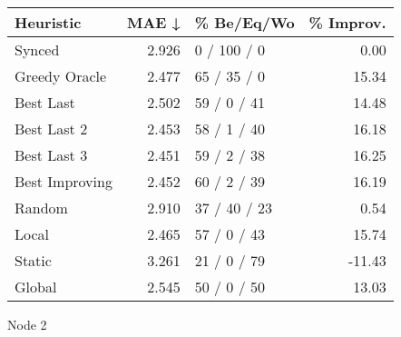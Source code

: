 \begin{tabular}{lrlr}
\toprule
\textbf{Heuristic} & \textbf{MAE ↓} & \textbf{\% Be/Eq/Wo} & \textbf{\% Improv.} \\
\midrule
            Synced &          2.926 &          0 / 100 / 0 &                0.00 \\
     Greedy Oracle &          2.477 &          65 / 35 / 0 &               15.34 \\
         Best Last &          2.502 &          59 / 0 / 41 &               14.48 \\
       Best Last 2 &          2.453 &          58 / 1 / 40 &               16.18 \\
       Best Last 3 &          2.451 &          59 / 2 / 38 &               16.25 \\
    Best Improving &          2.452 &          60 / 2 / 39 &               16.19 \\
            Random &          2.910 &         37 / 40 / 23 &                0.54 \\
             Local &          2.465 &          57 / 0 / 43 &               15.74 \\
            Static &          3.261 &          21 / 0 / 79 &              -11.43 \\
            Global &          2.545 &          50 / 0 / 50 &               13.03 \\
\bottomrule
\end{tabular}
\caption{Node 2}
\label{tab:ds_iid_lr01_le2_bs2_2}
